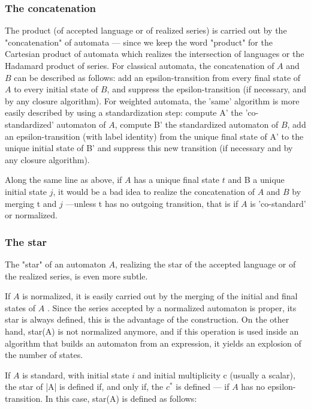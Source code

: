 \subsubsection{The concatenation}

The product (of accepted language or of realized series) is carried
out by the "concatenation" of automata --- since we keep the word
"product" for the Cartesian product of automata which realizes the
intersection of languages or the Hadamard product of series. For
classical automata, the concatenation of $A$ and $B$ can be described as
follows: add an epsilon-transition from every final state of $A$ to
every initial state of $B$, and suppress the epsilon-transition (if
necessary, and by any closure algorithm). For weighted automata, the
'same' algorithm is more easily described by using a standardization
step: compute A' the 'co-standardized' automaton of $A$, compute B' the
standardized automaton of $B$, add an epsilon-transition (with label
identity) from the unique final state of A' to the unique initial
state of B' and suppress this new transition (if necessary and by any
closure algorithm).

\begin{remark}
  Along the same line as above, if $A$ has a unique final state $t$ and
  B a unique initial state $j$, it would be a bad idea to realize the
  concatenation of $A$ and $B$ by merging t and $j$ ---unless t has no
  outgoing transition, that is if $A$ is 'co-standard' or normalized.
\end{remark}


\subsubsection{The star}

The "star" of an automaton $A$, realizing the star of the accepted
language or of the realized series, is even more subtle.

If $A$ is normalized, it is easily carried out by the merging of the
initial and final states of $A$ . Since the series accepted by a
normalized automaton is proper, its star is always defined, this is
the advantage of the construction. On the other hand, star(A) is not
normalized anymore, and if this operation is used inside an algorithm
that builds an automaton from an expression, it yields an explosion of
the number of states.

If $A$ is standard, with initial state $i$ and initial multiplicity c
(usually a scalar), the star of |A| is defined if, and only if, the
$c^{*}$ is defined \cite[Prop. III.2.6]{sakarovitch.03.eta} --- if $A$ has
no epsilon-transition.  In this case, star(A) is defined as follows:

